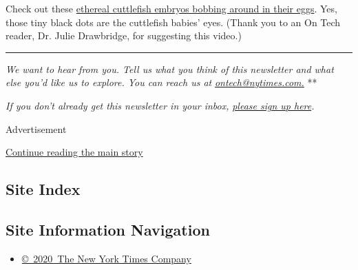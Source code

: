 Check out these \href{https://vimeo.com/424875558}{ethereal cuttlefish
embryos bobbing around in their eggs}. Yes, those tiny black dots are
the cuttlefish babies' eyes. (Thank you to an On Tech reader, Dr. Julie
Drawbridge, for suggesting this video.)

\begin{center}\rule{0.5\linewidth}{\linethickness}\end{center}

\emph{We want to hear from you. Tell us what you think of this
newsletter and what else you'd like us to explore. You can reach us at}
\href{mailto:ontech@nytimes.com?subject=On\%20Tech\%20Feedback}{\emph{ontech@nytimes.com.}}
**

\emph{If you don't already get this newsletter in your inbox,}
\href{https://www.nytimes.com/newsletters/signup/OT}{\emph{please sign
up here}}\emph{.}

Advertisement

\protect\hyperlink{after-bottom}{Continue reading the main story}

\hypertarget{site-index}{%
\subsection{Site Index}\label{site-index}}

\hypertarget{site-information-navigation}{%
\subsection{Site Information
Navigation}\label{site-information-navigation}}

\begin{itemize}
\tightlist
\item
  \href{https://help.nytimes.com/hc/en-us/articles/115014792127-Copyright-notice}{©~2020~The
  New York Times Company}
\end{itemize}

